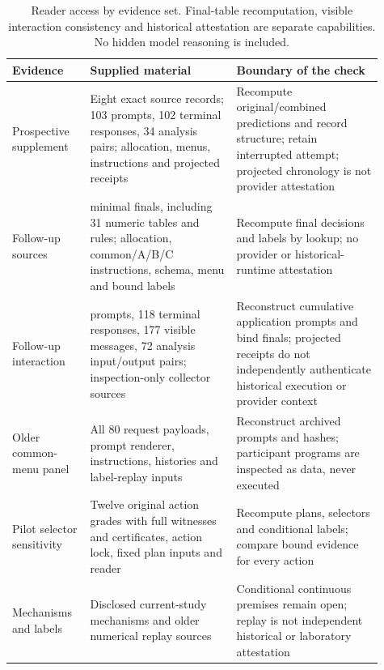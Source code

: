 \begin{table}[htbp]
\centering\small
\begin{tabular}{>{\raggedright\arraybackslash}p{0.19\linewidth}>{\raggedright\arraybackslash}p{0.36\linewidth}>{\raggedright\arraybackslash}p{0.36\linewidth}}\toprule
Evidence & Supplied material & Boundary of the check\\\midrule
Prospective supplement & Eight exact source records; 103 prompts, 102 terminal responses, 34 analysis pairs; allocation, menus, instructions and projected receipts & Recompute original/combined predictions and record structure; retain interrupted attempt; projected chronology is not provider attestation\\
Follow-up sources & 46 minimal finals, including 31 numeric tables and rules;
allocation, common/A/B/C instructions, schema, menu and bound labels & Recompute
final decisions and labels by lookup; no provider or historical-runtime attestation\\
Follow-up interaction & 120 prompts, 118 terminal responses, 177 visible messages, 72 analysis input/output pairs; inspection-only collector sources &
Reconstruct cumulative application prompts and bind finals; projected receipts do not independently authenticate historical execution or provider context\\
Older common-menu panel & All 80 request payloads, prompt renderer, instructions,
histories and label-replay inputs & Reconstruct archived prompts and hashes;
participant programs are inspected as data, never executed\\
Pilot selector sensitivity & Twelve original action grades with full witnesses
and certificates, action lock, fixed plan inputs and reader & Recompute plans,
selectors and conditional labels; compare bound evidence for every action\\
Mechanisms and labels & Disclosed current-study mechanisms and older numerical
replay sources & Conditional continuous premises remain open;
replay is not independent historical or laboratory attestation\\\bottomrule
\end{tabular}
\caption{Reader access by evidence set. Final-table recomputation, visible
interaction consistency and historical attestation are separate capabilities.
No hidden model reasoning is included.}
\label{tab:evidence-access}
\end{table}


